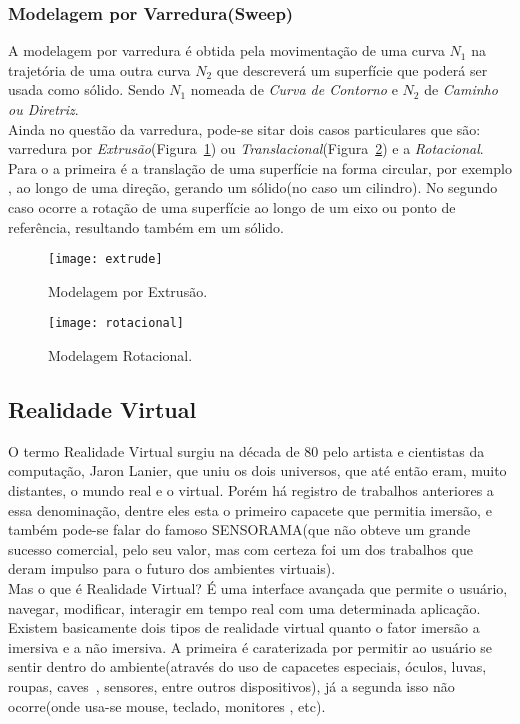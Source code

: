 \subsubsection{Modelagem por Varredura(Sweep)}
A modelagem por varredura é obtida pela movimentação de uma curva $N_1$ na trajetória de uma outra curva $N_2$ que descreverá um superfície que poderá ser usada como sólido. Sendo $N_1$ nomeada de \textit{Curva de Contorno} e $N_2$ de \textit{Caminho ou Diretriz}\cite{3dsmod}.\\

Ainda no questão da varredura, pode-se sitar dois casos particulares que são: varredura por \textit{Extrusão}(Figura~\ref{fg:etrusao}) ou \textit{Translacional}(Figura~\ref{fg:rotacional}) e a \textit{Rotacional}. Para o a primeira é a translação de uma superfície na forma circular, por exemplo , ao longo de uma direção, gerando um sólido(no caso um cilindro). No segundo caso ocorre a rotação de uma superfície ao longo de um eixo ou ponto de referência, resultando também em um sólido.

\begin{figure}[ht!]
	\centering
	\texttt{[image: extrude]}
	\caption{Modelagem por Extrusão.}
	\label{fg:etrusao}
\end{figure} 
\begin{figure}[ht!]
	\centering
	\texttt{[image: rotacional]}
	\caption{Modelagem Rotacional.}
	\label{fg:rotacional}
\end{figure} 

\subsection{Realidade Virtual}
O termo Realidade Virtual surgiu na década de 80 pelo artista e cientistas da computação, Jaron Lanier, que uniu os dois universos, que até então eram, muito distantes, o mundo real e o virtual\cite{jane}. Porém há registro de trabalhos anteriores a essa denominação, dentre eles esta o primeiro capacete que permitia imersão, e também pode-se falar do famoso SENSORAMA\cite{rhen}(que não obteve um grande sucesso comercial, pelo seu valor, mas com certeza foi um dos trabalhos que deram impulso para o futuro dos ambientes virtuais).\\

Mas o que é Realidade Virtual? É uma interface avançada que permite o usuário, navegar, modificar, interagir em tempo real com uma determinada aplicação. Existem basicamente dois tipos de realidade virtual quanto o fator imersão a imersiva e a não imersiva. A primeira é caraterizada por permitir ao usuário se sentir dentro do ambiente(através do uso de capacetes especiais, óculos, luvas, roupas, caves~\cite{cave}, sensores, entre outros dispositivos), já a segunda isso não ocorre(onde usa-se mouse, teclado, monitores , etc)\cite{aect}.

